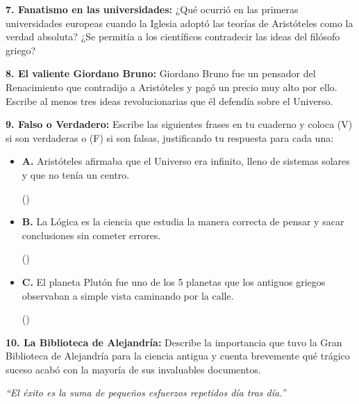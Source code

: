 \documentclass[12pt, letterpaper]{article}
\newif\ifshowanswers
\newcommand{\respAbierta}[2][3cm]{
	\ifshowanswers
	\par\vspace{0.2cm}
	\textbf{\textcolor{blue}{Respuesta:}} \textcolor{blue}{#2}
	\vspace{0.2cm}
	\else
	\par\vspace{#1} %
	\fi
}
\newcommand{\respVF}[2]{
	\ifshowanswers
	\textbf{\textcolor{blue}{#1}} \textcolor{blue}{#2}
	\else
	(\quad) \vspace{0.8cm}
	\fi
}
\begin{document}
	\vspace{0.3cm}
	\noindent \textbf{7. Fanatismo en las universidades:} ¿Qué ocurrió en las primeras universidades europeas cuando la Iglesia adoptó las teorías de Aristóteles como la verdad absoluta? ¿Se permitía a los científicos contradecir las ideas del filósofo griego?
	\respAbierta[2cm]{Las ideas de Aristóteles dominaron las enseñanzas y sus seguidores se volvieron fanáticos. Protegidos por la Iglesia Católica, prohibieron y persiguieron a cualquiera que intentara contradecir las ideas del filósofo griego.}
	
	\vspace{0.3cm}
	\noindent \textbf{8. El valiente Giordano Bruno:} Giordano Bruno fue un pensador del Renacimiento que contradijo a Aristóteles y pagó un precio muy alto por ello. Escribe al menos tres ideas revolucionarias que él defendía sobre el Universo.
	\respAbierta[2.5cm]{Bruno defendía que la Tierra flotaba en el espacio y dejaba de ser el centro del Universo, que el universo era totalmente infinito, y que las estrellas que vemos en el cielo son realmente otros soles que pueden tener sus propios planetas.}
	
	\vspace{0.3cm}
	\noindent \textbf{9. Falso o Verdadero:} Escribe las siguientes frases en tu cuaderno y coloca (V) si son verdaderas o (F) si son falsas, justificando tu respuesta para cada una:
	\begin{itemize}[itemsep=0.1cm]
		\item \textbf{A.} Aristóteles afirmaba que el Universo era infinito, lleno de sistemas solares y que no tenía un centro. \respVF{F}{- Aristóteles pensaba que el Universo era finito y que la Tierra inmóvil era el centro.}
		\item \textbf{B.} La Lógica es la ciencia que estudia la manera correcta de pensar y sacar conclusiones sin cometer errores. \respVF{V}{- Esta ciencia fue uno de los aportes más grandes de Aristóteles.}
		\item \textbf{C.} El planeta Plutón fue uno de los 5 planetas que los antiguos griegos observaban a simple vista caminando por la calle. \respVF{F}{- Plutón es imposible de ver a simple vista; los griegos solo veían hasta Saturno.}
	\end{itemize}
	
	\vspace{0.3cm}
	\noindent \textbf{10. La Biblioteca de Alejandría:} Describe la importancia que tuvo la Gran Biblioteca de Alejandría para la ciencia antigua y cuenta brevemente qué trágico suceso acabó con la mayoría de sus invaluables documentos.
	\respAbierta[2.5cm]{Fue el principal centro del saber del mundo antiguo porque albergaba prácticamente todo el conocimiento humano escrito en rollos de papiro. Lamentablemente, la mayoría de estos invaluables documentos se perdieron para siempre tras ser consumida por un gran incendio.}
	
	\vfill
	\begin{center}
		\textit{\color{valdark!70} ``El éxito es la suma de pequeños esfuerzos repetidos día tras día.''}
	\end{center}
	
\end{document}
